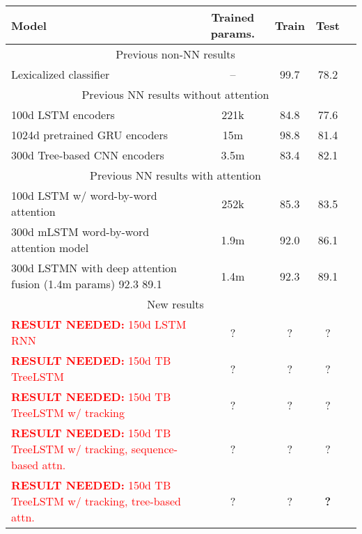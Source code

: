 \documentclass[11pt,letterpaper]{article}
\newcommand\result[1]{\textcolor{red}{\textbf{RESULT NEEDED:} #1}}
\begin{document}
\begin{table*}[t]
  \centering\small
  \begin{tabular}{lcccc} 
    \toprule
Model                   & Trained params.    &   Train  &   Test \\
\midrule
\multicolumn{4}{c}{Previous non-NN results}\\
\midrule
Lexicalized classifier \cite{snli:emnlp2015}
                        & --                 &   99.7   &   78.2      \\
\midrule
\multicolumn{4}{c}{Previous NN results without attention}\\
\midrule
100d LSTM encoders \cite{snli:emnlp2015}
                        & 221k               &   84.8   &   77.6      \\
1024d pretrained GRU encoders \cite{DBLP:journals/corr/VendrovKFU15}
                        & 15m                &   98.8   &   81.4       \\
300d Tree-based CNN encoders \cite{mou2015recognizing}
                        & 3.5m               &   83.4   &   82.1       \\
\midrule
\multicolumn{4}{c}{Previous NN results with attention}\\
\midrule
100d LSTM w/ word-by-word attention \cite{rocktaschel2015reasoning}
                        & 252k               &   85.3   &   83.5       \\
300d mLSTM word-by-word attention model \cite{DBLP:journals/corr/WangJ15b}
                        & 1.9m               &   92.0   &   86.1      \\
300d LSTMN with deep attention fusion \cite{cheng2016long} (1.4m params) 92.3    89.1

                        & 1.4m               &   92.3   &   89.1      \\
\midrule
\multicolumn{4}{c}{New results}\\
\midrule
\result{150d LSTM RNN      }     & ?                  &   ?      &   ?       \\
\result{150d TB TreeLSTM}   
                        & ?                  &   ?      &   ?       \\
\result{150d TB TreeLSTM w/ tracking    }
                        & ?                  &   ?      &   ?       \\
\result{150d TB TreeLSTM w/ tracking, sequence-based attn.   }     
                        & ?                  &   ?      &   ?       \\
\result{150d TB TreeLSTM w/ tracking, tree-based attn. }           
                        & ?                  &   ?      &   \textbf{?}\\
    \bottomrule
  \end{tabular}
  \protect\caption{\protect\label{tab:results}Results on SNLI 3-way inference classification. All reported figures are percent accuracy. \result{[JG]Add seconds-per-step *if* we get a reasonably well-optimized model in time.}} 
\end{table*}
\end{document}
